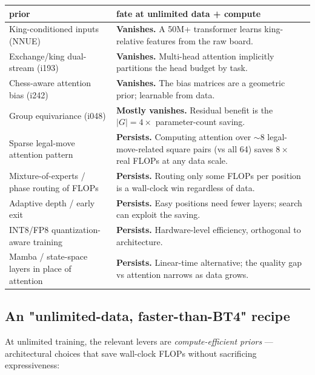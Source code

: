 \documentclass[10pt,a4paper]{article}
\begin{document}
\begin{tcolorbox}[goodcallout, title=Which advantages persist? Which vanish?]
\begin{footnotesize}
\begin{tabularx}{\linewidth}{@{}p{6cm} L@{}}
\toprule
\textbf{prior} & \textbf{fate at unlimited data + compute} \\
\midrule
King-conditioned inputs (NNUE) & \textbf{Vanishes.} A 50M+ transformer learns king-relative features from the raw board. \\
Exchange/king dual-stream (i193) & \textbf{Vanishes.} Multi-head attention implicitly partitions the head budget by task. \\
Chess-aware attention bias (i242) & \textbf{Vanishes.} The bias matrices are a geometric prior; learnable from data. \\
Group equivariance (i048) & \textbf{Mostly vanishes.} Residual benefit is the $|G|=4\times$ parameter-count saving. \\
\midrule
Sparse legal-move attention pattern & \textbf{Persists.} Computing attention over $\sim$8 legal-move-related square pairs (vs all 64) saves $8\times$ real FLOPs at any data scale. \\
Mixture-of-experts / phase routing of FLOPs & \textbf{Persists.} Routing only some FLOPs per position is a wall-clock win regardless of data. \\
Adaptive depth / early exit & \textbf{Persists.} Easy positions need fewer layers; search can exploit the saving. \\
INT8/FP8 quantization-aware training & \textbf{Persists.} Hardware-level efficiency, orthogonal to architecture. \\
Mamba / state-space layers in place of attention & \textbf{Persists.} Linear-time alternative; the quality gap vs attention narrows as data grows. \\
\bottomrule
\end{tabularx}
\end{footnotesize}
\end{tcolorbox}

\subsection{An "unlimited-data, faster-than-BT4" recipe}

At unlimited training, the relevant levers are \emph{compute-efficient
priors} --- architectural choices that save wall-clock FLOPs without
sacrificing expressiveness:
\end{document}

